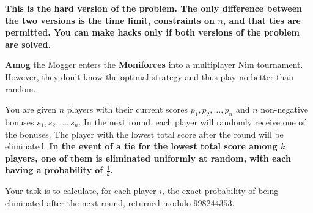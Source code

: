 \textbf{This is the hard version of the problem. The only difference between the two versions is the time limit, constraints on $n$, and that ties are permitted. You can make hacks only if both versions of the problem are solved.}

\textbf{Amog} the Mogger enters the \textbf{Moniforces} into a multiplayer Nim tournament. However, they don't know the optimal strategy and thus play no better than random. 

You are given $n$ players with their current scores $p_1, p_2, \ldots, p_n$ and $n$ non-negative bonuses $s_1, s_2, \ldots, s_n$. In the next round, each player will randomly receive one of the bonuses. The player with the lowest total score after the round will be eliminated. \textbf{In the event of a tie for the lowest total score among $k$ players, one of them is eliminated uniformly at random, with each having a probability of $\frac{1}{k}$.}

Your task is to calculate, for each player $i$, the exact probability of being eliminated after the next round, returned modulo $998244353$.